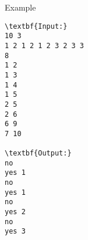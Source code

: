 Example
\begin{verbatim}
\textbf{Input:}
10 3
1 2 1 2 1 2 3 2 3 3
8
1 2
1 3
1 4
1 5
2 5
2 6
6 9
7 10

\textbf{Output:}
no
yes 1
no
yes 1
no
yes 2
no
yes 3\end{verbatim}